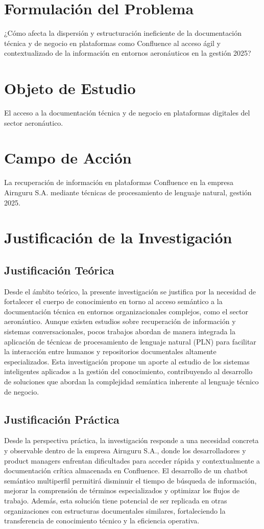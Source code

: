 \section{Formulación del Problema}
¿Cómo afecta la dispersión y estructuración ineficiente de la documentación técnica y de negocio en plataformas como Confluence al acceso ágil y contextualizado de la información en entornos aeronáuticos en la gestión 2025?

\section{Objeto de Estudio}
El acceso a la documentación técnica y de negocio en plataformas digitales del sector aeronáutico.

\section{Campo de Acción}
La recuperación de información en plataformas Confluence en la empresa Airnguru S.A. mediante técnicas de procesamiento de lenguaje natural, gestión 2025.

\section{Justificación de la Investigación}

\subsection{Justificación Teórica}
Desde el ámbito teórico, la presente investigación se justifica por la necesidad de fortalecer el cuerpo de conocimiento en torno al acceso semántico a la documentación técnica en entornos organizacionales complejos, como el sector aeronáutico. Aunque existen estudios sobre recuperación de información y sistemas conversacionales, pocos trabajos abordan de manera integrada la aplicación de técnicas de procesamiento de lenguaje natural (PLN) para facilitar la interacción entre humanos y repositorios documentales altamente especializados. Esta investigación propone un aporte al estudio de los sistemas inteligentes aplicados a la gestión del conocimiento, contribuyendo al desarrollo de soluciones que abordan la complejidad semántica inherente al lenguaje técnico de negocio.

\subsection{Justificación Práctica}
Desde la perspectiva práctica, la investigación responde a una necesidad concreta y observable dentro de la empresa Airnguru S.A., donde los desarrolladores y product managers enfrentan dificultades para acceder rápida y contextualmente a documentación crítica almacenada en Confluence. El desarrollo de un chatbot semántico multiperfil permitirá disminuir el tiempo de búsqueda de información, mejorar la comprensión de términos especializados y optimizar los flujos de trabajo. Además, esta solución tiene potencial de ser replicada en otras organizaciones con estructuras documentales similares, fortaleciendo la transferencia de conocimiento técnico y la eficiencia operativa.

